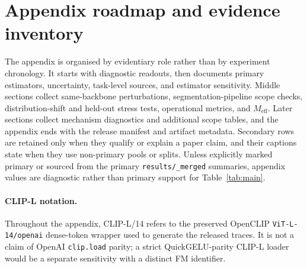 \section{Appendix roadmap and evidence inventory}
\label{app:roadmap}

The appendix is organised by evidentiary role rather than by experiment
chronology. It starts with diagnostic readouts, then documents primary
estimators, uncertainty, task-level sources, and estimator sensitivity. Middle
sections collect same-backbone perturbations, segmentation-pipeline scope
checks, distribution-shift and held-out stress tests, operational metrics, and
$M_{\mathrm{eff}}$. Later sections collect mechanism diagnostics and additional
scope tables, and the appendix ends with the release manifest and artifact
metadata. Secondary rows are retained only when they qualify or explain a paper
claim, and their captions state when they use non-primary pools or splits.
Unless explicitly marked primary or sourced from the primary
\texttt{results/\_merged} summaries, appendix values are diagnostic rather than
primary support for Table~\ref{tab:main}.

\paragraph{CLIP-L notation.}
Throughout the appendix, CLIP-L/14 refers to the preserved OpenCLIP
\texttt{ViT-L-14/openai} dense-token wrapper used to generate the released
traces. It is not a claim of OpenAI \texttt{clip.load} parity; a strict
QuickGELU-parity CLIP-L loader would be a separate sensitivity with a distinct
FM identifier.

